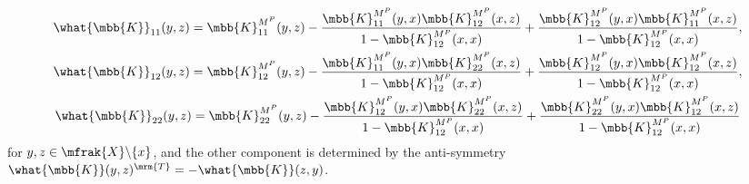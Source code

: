 \begin{gather*}
\what{\mbb{K}}_{11}(y,z) =\mbb{K}^{M^{P}}_{11}(y,z)-\frac{\mbb{K}^{M^{P}}_{11}(y,x)\mbb{K}^{M^{P}}_{12}(x,z)}{1-\mbb{K}^{M^{P}}_{12}(x,x)}+\frac{\mbb{K}^{M^{P}}_{12}(y,x)\mbb{K}^{M^{P}}_{11}(x,z)}{1-\mbb{K}^{M^{P}}_{12}(x,x)}, \\
\what{\mbb{K}}_{12}(y,z) =\mbb{K}^{M^{P}}_{12}(y,z)-\frac{\mbb{K}^{M^{P}}_{11}(y,x)\mbb{K}^{M^{P}}_{22}(x,z)}{1-\mbb{K}^{M^{P}}_{12}(x,x)}+\frac{\mbb{K}^{M^{P}}_{12}(y,x)\mbb{K}^{M^{P}}_{12}(x,z)}{1-\mbb{K}^{M^{P}}_{12}(x,x)}, \\
\what{\mbb{K}}_{22}(y,z) =\mbb{K}^{M^{P}}_{22}(y,z)-\frac{\mbb{K}^{M^{P}}_{12}(y,x)\mbb{K}^{M^{P}}_{22}(x,z)}{1-\mbb{K}^{M^{P}}_{12}(x,x)}+\frac{\mbb{K}^{M^{P}}_{22}(y,x)\mbb{K}^{M^{P}}_{12}(x,z)}{1-\mbb{K}^{M^{P}}_{12}(x,x)}
\end{gather*}
for $y,z\in\mfrak{X}\backslash\{x\}$, and the other component is determined by the anti-symmetry $\what{\mbb{K}}(y,z)^{\mrm{T}}=-\what{\mbb{K}}(z,y)$.

